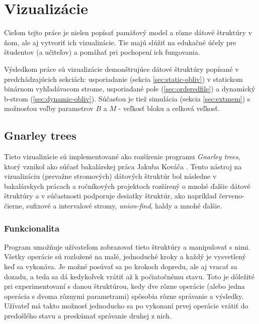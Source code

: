 \chapter{Vizualizácie}

Cieľom tejto práce je nielen popísať \obliv pamäťový model a rôzne dátové štruktúry v ňom, ale aj vytvoriť ich vizualizácie. Tie majú slúžiť na edukačné účely pre študentov (a učiteľov) a pomáhať pri pochopení ich fungovania.

Výsledkom práce sú vizualizácie demonštrujúce dátové štruktúry popísané v predchádzajúcich sekciách: \vEB usporiadanie (sekcia \ref{sec:static-obliv}) v statickom binárnom vyhľadávacom strome, usporiadané pole (\ref{sec:orderedfile}) a dynamický b-strom (\ref{sec:dynamic-obliv}). Súčasťou je tiež simulácia \cache (sekcia \ref{sec:extmem}) s možnosťou voľby parametrov $B$ a $M$ - veľkosť bloku a celková veľkosť.


\section{Gnarley trees}
Tieto vizualizácie sú implementované ako rozšírenie programu \emph{Gnarley trees}, ktorý vznikol ako súčasť bakalárskej práca Jakuba Kováča \citep{algviskuko}. Tento nástroj na vizualizáciu (prevažne stromových) dátových štruktúr bol následne v bakalárskych prácach \citep{algviskotrlova, algvistomkovic, algvislukca} a ročníkových projektoch rozšírený o mnohé ďalšie dátové štruktúry a v súčastnosti podporuje desiatky štruktúr, ako napríklad červeno-čierne, sufixové a intervalové stromy, \emph{union-find}, haldy a mnohé ďalšie.

\subsection{Funkcionalita}
Program umožňuje užívateľom zobrazovať tieto štruktúry a manipulovať s nimi. Všetky operácie sú rozložené na malé, jednoduché kroky a každý je vysvetlený keď sa vykonáva. Je možné posúvať sa po krokoch dopredu, ale aj vracať sa dozadu, a teda sa dá kedykoľvek vrátiť až k počiatočnému stavu. Toto je dôležité pri experimentovaní s danou štruktúrou, kedy dve rôzne operácie (alebo jedna operácia s dvoma rôznymi parametrami) spôsobia rôzne správanie a výsledky. Užívateľ má takto možnosť jednoducho sa po vykonaní prvej operácie vrátiť do predošlého stavu a preskúmať správanie druhej z nich.

